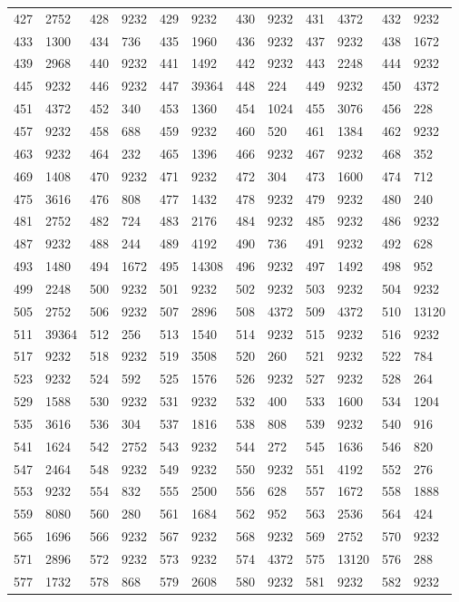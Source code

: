 \begin{longtable}{llllllllllll}
427 & 2752&428 &9232&429& 9232&430 &9232&431 &4372&432& 9232\\
433 & 1300&434 &736&435& 1960&436 &9232&437 &9232&438& 1672\\
439 & 2968&440 &9232&441& 1492&442 &9232&443 &2248&444& 9232\\
445 & 9232&446 &9232&447& 39364&448 &224&449 &9232&450& 4372\\
451 & 4372&452 &340&453& 1360&454 &1024&455 &3076&456& 228\\
457 & 9232&458 &688&459& 9232&460 &520&461 &1384&462& 9232\\
463 & 9232&464 &232&465& 1396&466 &9232&467 &9232&468& 352\\
469 & 1408&470 &9232&471& 9232&472 &304&473 &1600&474& 712\\
475 & 3616&476 &808&477& 1432&478 &9232&479 &9232&480& 240\\
481 & 2752&482 &724&483& 2176&484 &9232&485 &9232&486& 9232\\
487 & 9232&488 &244&489& 4192&490 &736&491 &9232&492& 628\\
493 & 1480&494 &1672&495& 14308&496 &9232&497 &1492&498& 952\\
499 & 2248&500 &9232&501& 9232&502 &9232&503 &9232&504& 9232\\
505 & 2752&506 &9232&507& 2896&508 &4372&509 &4372&510& 13120\\
511 & 39364&512 &256&513& 1540&514 &9232&515 &9232&516& 9232\\
517 & 9232&518 &9232&519& 3508&520 &260&521 &9232&522& 784\\
523 & 9232&524 &592&525& 1576&526 &9232&527 &9232&528& 264\\
529 & 1588&530 &9232&531& 9232&532 &400&533 &1600&534& 1204\\
535 & 3616&536 &304&537& 1816&538 &808&539 &9232&540& 916\\
541 & 1624&542 &2752&543& 9232&544 &272&545 &1636&546& 820\\
547 & 2464&548 &9232&549& 9232&550 &9232&551 &4192&552& 276\\
553 & 9232&554 &832&555& 2500&556 &628&557 &1672&558& 1888\\
559 & 8080&560 &280&561& 1684&562 &952&563 &2536&564& 424\\
565 & 1696&566 &9232&567& 9232&568 &9232&569 &2752&570& 9232\\
571 & 2896&572 &9232&573& 9232&574 &4372&575 &13120&576& 288\\
577 & 1732&578 &868&579& 2608&580 &9232&581 &9232&582& 9232\\

\end{longtable}
